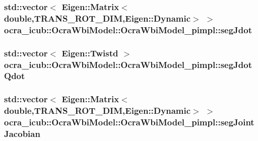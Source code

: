 \hypertarget{structOcraWbiModel_1_1OcraWbiModel__pimpl_ab0371f4015f7abdf795636003e302de1}{
\subsubsection[{seg\-Jdot}]{\setlength{\rightskip}{0pt plus 5cm}std\-::vector$<$ \-Eigen\-::\-Matrix$<$double,{\bf \-T\-R\-A\-N\-S\-\_\-\-R\-O\-T\-\_\-\-D\-I\-M},\-Eigen\-::\-Dynamic$>$ $>$ {\bf ocra\-\_\-icub\-::\-Ocra\-Wbi\-Model\-::\-Ocra\-Wbi\-Model\-\_\-pimpl\-::seg\-Jdot}}}\label{structOcraWbiModel_1_1OcraWbiModel__pimpl_ab0371f4015f7abdf795636003e302de1}
\hypertarget{structOcraWbiModel_1_1OcraWbiModel__pimpl_aa8c16d833a534ce9975a10202aa145a3}{
\subsubsection[{seg\-Jdot\-Qdot}]{\setlength{\rightskip}{0pt plus 5cm}std\-::vector$<$ \-Eigen\-::\-Twistd $>$ {\bf ocra\-\_\-icub\-::\-Ocra\-Wbi\-Model\-::\-Ocra\-Wbi\-Model\-\_\-pimpl\-::seg\-Jdot\-Qdot}}}\label{structOcraWbiModel_1_1OcraWbiModel__pimpl_aa8c16d833a534ce9975a10202aa145a3}
\hypertarget{structOcraWbiModel_1_1OcraWbiModel__pimpl_a4e1b970fc381b8c93bb41e4b3854986c}{
\subsubsection[{seg\-Joint\-Jacobian}]{\setlength{\rightskip}{0pt plus 5cm}std\-::vector$<$ \-Eigen\-::\-Matrix$<$double,{\bf \-T\-R\-A\-N\-S\-\_\-\-R\-O\-T\-\_\-\-D\-I\-M},\-Eigen\-::\-Dynamic$>$ $>$ {\bf ocra\-\_\-icub\-::\-Ocra\-Wbi\-Model\-::\-Ocra\-Wbi\-Model\-\_\-pimpl\-::seg\-Joint\-Jacobian}}}\label{structOcraWbiModel_1_1OcraWbiModel__pimpl_a4e1b970fc381b8c93bb41e4b3854986c}
